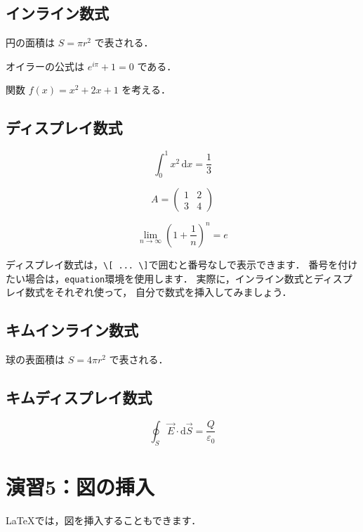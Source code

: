 \documentclass[a4paper,twocolumn]{jsarticle}
\newcommand{\dif}{\mathrm{d}}
\begin{document}
\subsection*{インライン数式}
円の面積は $S=\pi r^2$ で表される．

オイラーの公式は $e^{i\pi}+1=0$ である．

関数 $f(x)=x^2+2x+1$ を考える．

\subsection*{ディスプレイ数式}
\begin{equation}
\int_{0}^{1} x^2\,\dif x=\frac{1}{3}
\label{eq:integral}
\end{equation}

\begin{equation}
A=
\begin{pmatrix}
1 & 2\\
3 & 4
\end{pmatrix}
\label{eq:matrix}
\end{equation}

\begin{equation}
\lim_{n\to\infty}
\left(1+\frac{1}{n}\right)^n=e
\label{eq:euler}
\end{equation}

ディスプレイ数式は，\verb|\[ ... \]|で囲むと番号なしで表示できます．
番号を付けたい場合は，\verb|equation|環境を使用します．
実際に，インライン数式とディスプレイ数式をそれぞれ使って，
自分で数式を挿入してみましょう．


\subsection*{キムインライン数式}
球の表面積は $S=4\pi r^2$ で表される．

\subsection*{キムディスプレイ数式}
\begin{equation}
\oint_{S} \vec{E}\cdot \dif\vec{S}
=\frac{Q}{\varepsilon_0}
\label{eq:gauss}
\end{equation}


\section*{演習5：図の挿入}
LaTeXでは，図を挿入することもできます．
\end{document}
